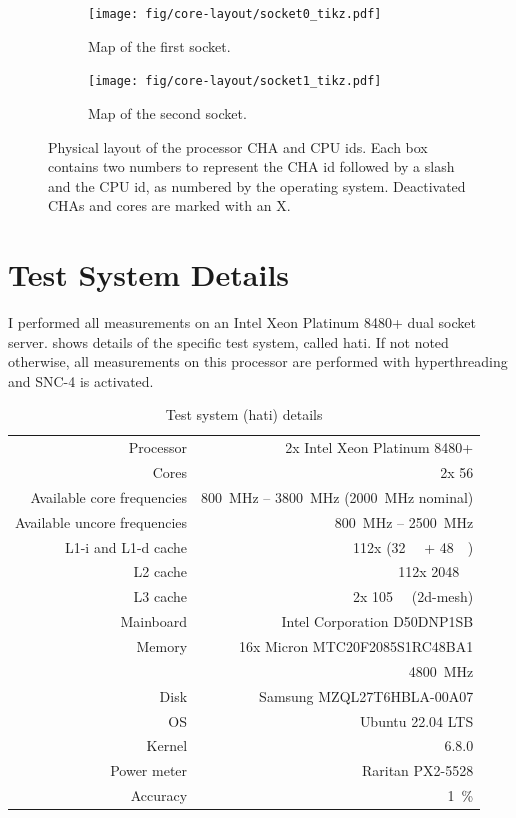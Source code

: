 \begin{figure}[]
    \begin{subfigure}[t]{0.45\linewidth}
        \centering
        \texttt{[image: fig/core-layout/socket0\_tikz.pdf]}
        \caption{Map of the first socket.}
    \end{subfigure}
    \hfill
    \begin{subfigure}[t]{0.45\linewidth}
        \centering
        \texttt{[image: fig/core-layout/socket1\_tikz.pdf]}
        \caption{Map of the second socket.}
    \end{subfigure}
    \caption{\label{fig:physical-layout}Physical layout of the processor CHA and CPU ids.
	Each box contains two numbers to represent the CHA id followed by a slash and the CPU id, as numbered by the operating system.
	Deactivated CHAs and cores are marked with an X.}
\end{figure}

\section{Test System Details}
I performed all measurements on an Intel Xeon Platinum 8480+ dual socket server.
 shows details of the specific test system, called hati.
If not noted otherwise, all measurements on this processor are performed with hyperthreading and SNC-4 is activated.

\begin{table}[t]
	\centering
	\caption{\label{tab:test-system}Test system (hati) details}
	\begin{tabular}{rr}
		\toprule
		Processor	&	2x Intel Xeon Platinum 8480+ \\
		\rowcolor[HTML]{EFEFEF}Cores		&	2x 56 \\
		Available core frequencies	&	\SI{800}{\MHz} -- \SI{3800}{\MHz} (\SI{2000}{\MHz} nominal) \\
		\rowcolor[HTML]{EFEFEF}Available uncore frequencies	&	\SI{800}{\MHz} -- \SI{2500}{\MHz} \\
		L1-i and L1-d cache	&	112x (\SI{32}{\kibi\byte} + \SI{48}{\kibi\byte})\\
		\rowcolor[HTML]{EFEFEF}L2 cache	&	112x \SI{2048}{\kibi\byte} \\
		L3 cache	&	2x \SI{105}{\mebi\byte} (2d-mesh) \\
		\rowcolor[HTML]{EFEFEF}Mainboard	&	Intel Corporation D50DNP1SB \\
		Memory		&	16x Micron MTC20F2085S1RC48BA1  \\
		 &	\SI{4800}{\mega\hertz} \\
		\rowcolor[HTML]{EFEFEF}Disk		&	Samsung MZQL27T6HBLA-00A07 \\
		OS           &   Ubuntu 22.04 LTS \\
		\rowcolor[HTML]{EFEFEF} Kernel          &   6.8.0 \\
		Power meter & Raritan PX2-5528\\
		\rowcolor[HTML]{EFEFEF} Accuracy & \SI{1}{\percent}\\
		\bottomrule
	\end{tabular}
\end{table}

